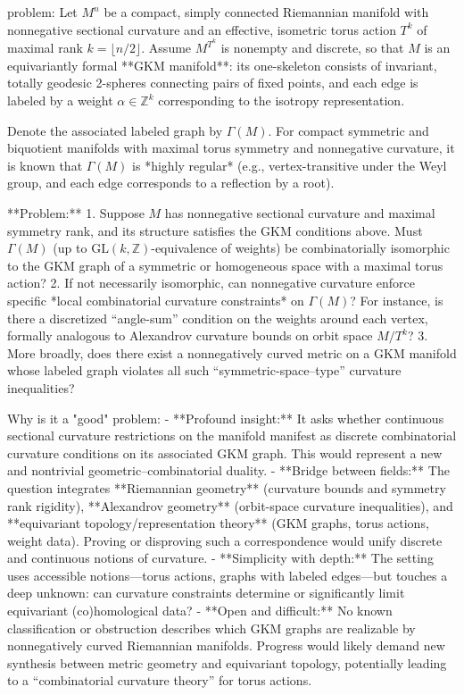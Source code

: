 problem:  
Let \( M^{n} \) be a compact, simply connected Riemannian manifold with nonnegative sectional curvature and an effective, isometric torus action \( T^{k} \) of maximal rank \( k = \lfloor n/2 \rfloor \). Assume \( M^{T^{k}} \) is nonempty and discrete, so that \( M \) is an equivariantly formal **GKM manifold**: its one-skeleton consists of invariant, totally geodesic 2-spheres connecting pairs of fixed points, and each edge is labeled by a weight \( \alpha \in \mathbb{Z}^{k} \) corresponding to the isotropy representation.  

Denote the associated labeled graph by \( \Gamma(M) \). For compact symmetric and biquotient manifolds with maximal torus symmetry and nonnegative curvature, it is known that \( \Gamma(M) \) is *highly regular* (e.g., vertex-transitive under the Weyl group, and each edge corresponds to a reflection by a root).  

**Problem:**  
1. Suppose \( M \) has nonnegative sectional curvature and maximal symmetry rank, and its structure satisfies the GKM conditions above. Must \( \Gamma(M) \) (up to \( \mathrm{GL}(k,\mathbb{Z}) \)-equivalence of weights) be combinatorially isomorphic to the GKM graph of a symmetric or homogeneous space with a maximal torus action?  
2. If not necessarily isomorphic, can nonnegative curvature enforce specific *local combinatorial curvature constraints* on \( \Gamma(M) \)? For instance, is there a discretized “angle-sum” condition on the weights around each vertex, formally analogous to Alexandrov curvature bounds on orbit space \( M/T^{k} \)?  
3. More broadly, does there exist a nonnegatively curved metric on a GKM manifold whose labeled graph violates all such “symmetric-space–type” curvature inequalities?  

Why is it a "good" problem:  
- **Profound insight:** It asks whether continuous sectional curvature restrictions on the manifold manifest as discrete combinatorial curvature conditions on its associated GKM graph. This would represent a new and nontrivial geometric–combinatorial duality.  
- **Bridge between fields:** The question integrates **Riemannian geometry** (curvature bounds and symmetry rank rigidity), **Alexandrov geometry** (orbit-space curvature inequalities), and **equivariant topology/representation theory** (GKM graphs, torus actions, weight data). Proving or disproving such a correspondence would unify discrete and continuous notions of curvature.  
- **Simplicity with depth:** The setting uses accessible notions—torus actions, graphs with labeled edges—but touches a deep unknown: can curvature constraints determine or significantly limit equivariant (co)homological data?  
- **Open and difficult:** No known classification or obstruction describes which GKM graphs are realizable by nonnegatively curved Riemannian manifolds. Progress would likely demand new synthesis between metric geometry and equivariant topology, potentially leading to a “combinatorial curvature theory” for torus actions.